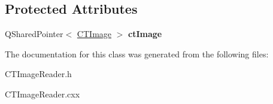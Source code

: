 \subsection*{Protected Attributes}
\begin{DoxyCompactItemize}
\item 
\hypertarget{class_c_t_image_reader_aa8949c25bef18ec4c29a65923b23a389}{
QSharedPointer$<$ \hyperlink{class_c_t_image}{CTImage} $>$ {\bfseries ctImage}}
\label{class_c_t_image_reader_aa8949c25bef18ec4c29a65923b23a389}

\end{DoxyCompactItemize}


The documentation for this class was generated from the following files:\begin{DoxyCompactItemize}
\item 
CTImageReader.h\item 
CTImageReader.cxx\end{DoxyCompactItemize}
